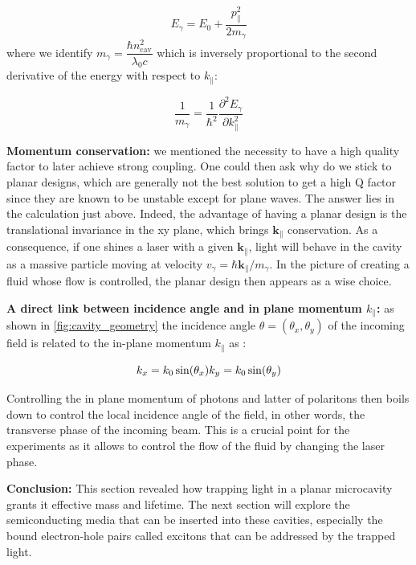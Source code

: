 \begin{equation}
    E_\gamma = E_0 + \dfrac{p_{\parallel}^2}{2m_{\gamma}}  
    \label{eq:photon_mass}
\end{equation}
where we identify $m_{\gamma} = \dfrac{\hbar n_{\mathrm{cav}}^2}{\lambda_0 c}$ which is inversely proportional to the second derivative of the energy with respect to $k_{\parallel}$:

\begin{equation}
    \dfrac{1}{m_{\gamma}} = \dfrac{1}{\hbar^2}\dfrac{\partial^2 E_{\gamma}}{\partial k_{\parallel}^2}
    \label{eq:mass}
\end{equation}

\noindent\textbf{Momentum conservation:}
we mentioned the necessity to have a high quality factor to later achieve strong coupling. One could then ask why do we stick to planar designs, which are generally not the best solution to get a high Q factor since they are known to be unstable except for plane waves. The answer lies in the calculation just above. Indeed, the advantage of having a planar design is the translational invariance in the xy plane, which brings $\bm{k_{\parallel}}$ conservation. As a consequence, if one shines a laser with a given $\bm{k_{\parallel}}$, light will behave in the cavity as a massive particle moving at velocity $v_\gamma=\hbar \bm{k_{\parallel}}/m_\gamma$. In the picture of creating a fluid whose flow is controlled, the planar design then appears as a wise choice.

\bigskip\noindent

\noindent\textbf{A direct link between incidence angle and in plane momentum $k_{\parallel}$:}
as shown in \autoref{fig:cavity_geometry} the incidence angle $\theta= (\theta_x, \theta_y)$ of the incoming field is related to the in-plane momentum $k_{\parallel}$ as :

\begin{equation}
    k_{x} = k_0 \sin(\theta_x) \\
    k_{y} = k_0 \sin(\theta_y)
    \label{eq:kpar}
\end{equation}

Controlling the in plane momentum of photons and latter of polaritons then boils down to control the local incidence angle of the field, in other words, the transverse phase of the incoming beam. This is a crucial point for the experiments as it allows to control the flow of the fluid by changing the laser phase.

\bigskip\noindent
\textbf{Conclusion:}
This section revealed how trapping light in a planar microcavity grants it effective mass and lifetime. The next section will explore the semiconducting media that can be inserted into these cavities, especially the bound electron-hole pairs called excitons that can be addressed by the trapped light.


